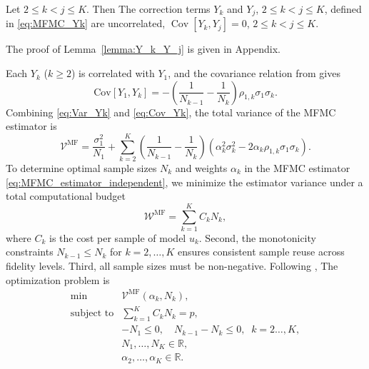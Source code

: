 \begin{lemma}\label{lemma:Y_k_Y_j}
Let $2\le k<j\le K$. Then 
  The correction terms $Y_k$ and $Y_j$, $2\le k<j \le K$, defined in \eqref{eq:MFMC_Yk} are uncorrelated,
  $\operatorname{Cov} [Y_k,Y_j ]=0$,  $2\le k<j \le K$.
\end{lemma}
The proof of Lemma~\ref{lemma:Y_k_Y_j} is given in Appendix.


Each $Y_k$ ($k\ge2$) is correlated with $Y_1$, and the covariance relation from \cite[Lemma~3.2]{PeWiGu:2016} gives
%
\begin{equation}\label{eq:Cov_Yk}
\text{Cov}[Y_1,Y_k] = - \left(\frac{1}{N_{k-1}} - \frac{1}{N_k}\right)\rho_{1,k}\sigma_1\sigma_k.
\end{equation}
%
Combining \eqref{eq:Var_Yk} and \eqref{eq:Cov_Yk}, the total variance of the MFMC estimator is
%
\begin{equation}\label{eq:MFMC_variance}
    \mathcal{V}^{\text{MF}}
    =\frac{\sigma_1^2}{N_1} 
    + \sum_{k=2}^K \left(\frac{1}{N_{k-1}} - \frac{1}{N_k}\right)\!\left(\alpha_k^2\sigma_k^2 - 2\alpha_k\rho_{1,k}\sigma_1\sigma_k\right).
\end{equation}
%
To determine optimal sample sizes $N_k$ and weights $\alpha_k$ in the MFMC estimator \eqref{eq:MFMC_estimator_independent}, we minimize the estimator variance under a total computational budget
\[
\mathcal{W}^{\text{MF}} = \sum_{k=1}^K C_k N_k,
\]
where $C_k$ is the cost per sample of model $u_k$. Second,  the monotonicity constraints $N_{k-1}\le N_k$ for $k=2,\ldots, K$ ensures consistent sample reuse across fidelity levels. Third, all sample sizes must be non-negative. Following \cite{PeWiGu:2016}, The optimization problem is
%
\begin{equation}\label{eq:Optimization_pb_sample_size}
    \begin{array}{ll}
    \min &\mathcal{V}^{\text{MF}}\left(\alpha_k,N_k\right),\\
       \text{subject to} &\displaystyle\sum\limits_{k=1}^K C_kN_k=p,\\[2pt]
       &\displaystyle -N_1\le 0,\quad \displaystyle N_{k-1}-N_k\le 0, \;\; k=2\ldots,K,\\
       &N_1,\ldots, N_K\in \mathbb{R},\\
       &\alpha_2,\ldots,\alpha_K\in \mathbb{R}.
    \end{array}
\end{equation}
%

